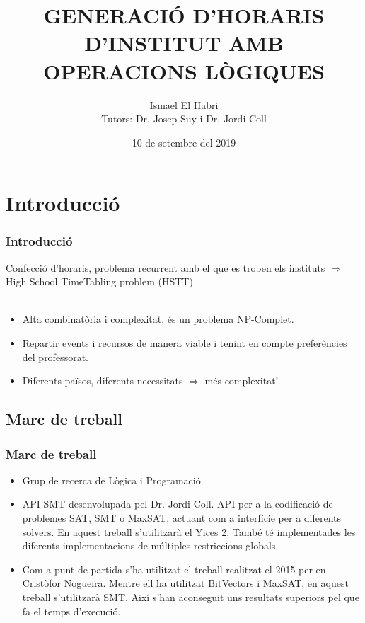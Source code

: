 \documentclass[11pt]{beamer}
\title[Generació d'horaris d'institut amb operacions lògiques]{GENERACIÓ D'HORARIS D'INSTITUT AMB OPERACIONS LÒGIQUES}
\author[Ismael El Habri]{Ismael El Habri \\ \footnotesize Tutors: Dr. Josep Suy i Dr. Jordi Coll}
\institute{Universitat de Girona}
\date[KPT 2004] %
{10 de setembre del 2019}
\begin{document}
\frame{\titlepage}

\section{Introducció}
  \begin{frame}
    \frametitle{Introducció}

    Confecció d'horaris, problema recurrent amb el que es troben els instituts $\Rightarrow$ High School TimeTabling problem (HSTT)\\ ~\\
    
    \begin{itemize}
      \item Alta combinatòria i complexitat, és un problema NP-Complet.
      \item Repartir events i recursos de manera viable i tenint en compte preferències del professorat.
      \item Diferents països, diferents necessitats  $\Rightarrow$  més complexitat!
    \end{itemize}
    
    


  \end{frame}
  \subsection{Marc de treball}
  \begin{frame}
    \frametitle{Marc de treball}
    \begin{itemize}
      \item Grup de recerca de Lògica i Programació
    
      \item API SMT desenvolupada pel Dr. Jordi Coll. API per a la codificació de problemes SAT, SMT o MaxSAT, 
      actuant com a interfície per a diferents solvers. En aquest treball s'utilitzarà el Yices 2. 
      També té implementades les diferents implementacions de múltiples restriccions globals.

      \item Com a punt de partida s'ha utilitzat el treball realitzat el 2015 per en Cristòfor Nogueira. 
      Mentre ell ha utilitzat BitVectors i MaxSAT, en aquest treball s'utilitzarà SMT. 
      Així s'han aconseguit uns resultats superiors pel que fa el temps d'execució.
    \end{itemize}

  \end{frame}
  
\end{document}
